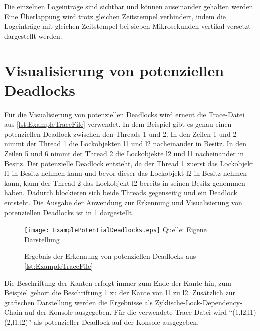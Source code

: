 Die einzelnen Logeinträge sind sichtbar und können auseinander gehalten werden.
Eine Überlappung wird trotz gleichen Zeitstempel verhindert, indem die
Logeinträge mit gleichen Zeitstempel bei sieben Mikrosekunden vertikal versetzt
dargestellt werden.

\section{Visualisierung von potenziellen Deadlocks}
\label{section:DeadlockVisualization}
Für die Visualisierung von potenziellen Deadlocks wird erneut die Trace-Datei
aus \cref{lst:ExampleTraceFile} verwendet. In dem Beispiel gibt es genau einen
potenziellen Deadlock zwischen den Threads \textrm{1} und \textrm{2}. In den
Zeilen 1 und 2 nimmt der Thread \textrm{1} die Lockobjekten \textrm{l1} und
\textrm{l2} nacheinander in Besitz. In den Zeilen 5 und 6 nimmt der Thread
\textrm{2} die Lockobjekte \textrm{l2} und \textrm{l1} nacheinander in Besitz.
Der potenzielle Deadlock entsteht, da der Thread \textrm{1} zuerst das
Lockobjekt \textrm{l1} in Besitz nehmen kann und bevor dieser das Lockobjekt
\textrm{l2} in Besitz nehmen kann, kann der Thread \textrm{2} das Lockobjekt
\textrm{l2} bereits in seinen Besitz genommen haben. Dadurch blockieren sich
beide Threads gegenseitig und ein Deadlock entsteht. Die Ausgabe der Anwendung
zur Erkennung und Visualisierung von potenziellen Deadlocks ist in
\cref{fig:DeadlockVisualization} dargestellt.
\begin{figure}[ht]
  \texttt{[image: ExamplePotentialDeadlocks.eps]}
  \footnotesize\sffamily Quelle: Eigene Darstellung
  \caption{Ergebnis der Erkennung von potenziellen Deadlocks aus \cref{lst:ExampleTraceFile}}
  \label{fig:DeadlockVisualization}
\end{figure}
Die Beschriftung der Kanten erfolgt immer zum Ende der Kante hin, zum Beispiel
gehört die Beschriftung \textrm{1} zu der Kante von \textrm{l1} zu \textrm{l2}.
Zusätzlich zur grafischen Darstellung werden die Ergebnisse als
Zyklische-Lock-Dependency-Chain auf der Konsole ausgegeben. Für die verwendete
Trace-Datei wird "`(1,l2,{l1}) (2,l1,{l2})"' als potenzieller Deadlock auf der
Konsole ausgegeben.